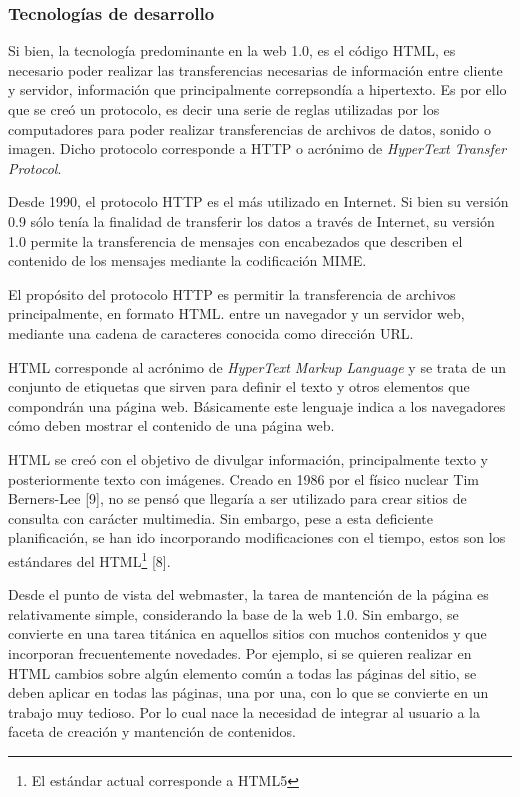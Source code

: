 \subsubsection{Tecnologías de desarrollo}

Si bien, la tecnología predominante en la web 1.0, es el código HTML, es necesario poder realizar las transferencias necesarias 
de información entre cliente y servidor, información que principalmente correpsondía a hipertexto. Es por ello que se creó un
protocolo, es decir una serie de reglas utilizadas por los computadores para poder realizar transferencias de archivos de datos,
sonido o imagen. Dicho protocolo corresponde a HTTP o acrónimo de \textit{HyperText Transfer Protocol}.

Desde 1990, el protocolo HTTP  es el más utilizado en Internet. Si bien su versión 0.9 sólo tenía la finalidad de transferir los datos a 
través de Internet, su versión 1.0 permite la transferencia de mensajes con encabezados que describen el contenido de los mensajes 
mediante la codificación MIME.

El propósito del protocolo HTTP es permitir la transferencia de archivos principalmente, en formato HTML. entre un navegador
y un servidor web,  mediante una cadena de caracteres conocida como dirección URL. 

HTML corresponde al acrónimo de \textit{HyperText Markup Language} y se trata de un conjunto de etiquetas que sirven para 
definir el texto y otros elementos que compondrán una página web. Básicamente este lenguaje indica a los navegadores cómo 
deben mostrar el contenido de una página web.

HTML se creó con el objetivo de divulgar información, principalmente texto y posteriormente texto con imágenes. 
Creado en 1986 por el físico nuclear Tim Berners-Lee [9], no se pensó que llegaría  a ser utilizado para crear sitios de 
consulta con carácter multimedia. Sin embargo, pese a esta deficiente planificación, se han ido incorporando modificaciones 
con el tiempo, estos son los estándares del HTML\footnote{El estándar actual corresponde a HTML5} [8].

Desde el punto de vista del webmaster, la tarea de mantención de la página es relativamente simple, considerando la base de 
la web 1.0. Sin embargo, se convierte en una tarea titánica en aquellos sitios con muchos contenidos y que incorporan 
frecuentemente novedades. Por ejemplo, si se quieren realizar en HTML cambios sobre algún elemento común a todas las páginas 
del sitio, se deben aplicar en todas las páginas, una por una, con lo que se  convierte en un trabajo muy tedioso. Por lo cual
nace la necesidad de integrar al usuario a la faceta de creación y mantención de contenidos.

